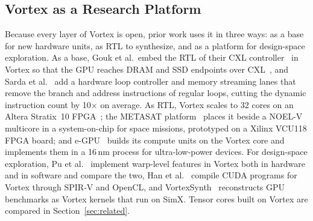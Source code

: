 \subsection{Vortex as a Research Platform}
\label{sec:bg_platform}

Because every layer of Vortex is open, prior work uses it in three ways: as a base for new hardware units, as RTL to synthesize, and as a platform for design-space exploration. As a base, Gouk et al.\ embed the RTL of their CXL controller~\cite{gouk2024breaking} in Vortex so that the GPU reaches DRAM and SSD endpoints over CXL~\cite{gouk2025cxlgpu}, and Sarda et al.~\cite{sarda2025decoupled} add a hardware loop controller and memory streaming lanes that remove the branch and address instructions of regular loops, cutting the dynamic instruction count by 10$\times$ on average. As RTL, Vortex scales to 32 cores on an Altera Stratix~10 FPGA~\cite{vortex}; the METASAT platform~\cite{bonet2025metasat} places it beside a NOEL-V multicore in a system-on-chip for space missions, prototyped on a Xilinx VCU118 FPGA board; and e-GPU~\cite{machetti2025egpu} builds its compute units on the Vortex core and implements them in a 16\,nm process for ultra-low-power devices. For design-space exploration, Pu et al.~\cite{pu2025warplevel} implement warp-level features in Vortex both in hardware and in software and compare the two, Han et al.~\cite{han2021cuda} compile CUDA programs for Vortex through SPIR-V and OpenCL, and VortexSynth~\cite{pu2026vortexsynth} reconstructs GPU benchmarks as Vortex kernels that run on SimX. Tensor cores built on Vortex are compared in Section~\ref{sec:related}.

